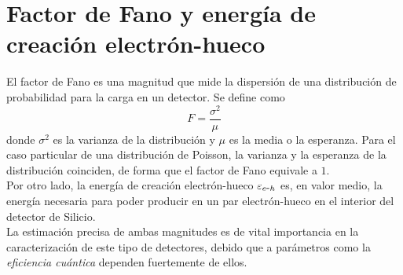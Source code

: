 \section{Factor de Fano y energía de creación electrón-hueco}
\noindent El factor de Fano es una magnitud que mide la dispersión de una distribución de probabilidad para la carga en un detector. Se define como
\begin{equation*}
    F = \frac{\sigma^{2}}{\mu}
\end{equation*}
donde $\sigma^{2}$ es la varianza de la distribución y $\mu$ es la media o la esperanza. Para el caso particular de una distribución de Poisson, la varianza y la esperanza de la distribución coinciden, de forma que el factor de Fano equivale a $1$.\\
\indent Por otro lado, la energía de creación electrón-hueco $\varepsilon_{e\mbox{-}h}$ es, en valor medio, la energía necesaria para poder producir en un par electrón-hueco en el interior del detector de Silicio.\\
\indent La estimación precisa de ambas magnitudes es de vital importancia en la caracterización de este tipo de detectores, debido que a parámetros como la \textit{eficiencia cuántica} dependen fuertemente de ellos.
